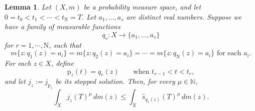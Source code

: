 \documentclass[11pt, reqno]{amsart}
\newtheorem{lemma}{Lemma}
\begin{document}
\begin{lemma}
\label{lem:finite-valued-integral}
Let $(X, m)$ be a probability measure space, and let $0=t_0<t_1<\cdots<t_{\mathrm{N}}=T$. Let $a_1, \ldots, a_s$ are distinct real numbers. Suppose we have a family of measurable functions
$$q_r:X\longrightarrow\{a_1, \ldots, a_s\}$$
for $r=1, \cdots, {\mathrm{N}}$, such that
\begin{equation}\label{eq:equal-level-measures}
m\{z:q_1(z)=a_i\}=
m\{z:q_2(z)=a_i\}=\cdots=
m\{z:q_{\mathrm{N}}(z)=a_i\} \text{ for each } a_i.
\end{equation}
For each $z\in X$, define
$$
\mathrm{p}_z(t)=q_r(z) \qquad\text{when }t_{r-1}<t<t_r,
$$
and let $j_z:=j_{\mathrm{p}_z}$ be its stopped solution. Then, for every $\mu\in \mathbb { N }$,
\begin{equation}\label{eq:finite-valued-integral}
\int_Xj_z(T)^\mu\, dm(z)
\le \int_X\widehat s_{q_1(z)}(T)^\mu\, dm(z).
\end{equation}
\end{lemma}
\end{document}
